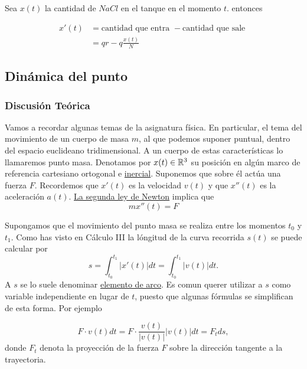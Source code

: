  Sea $x(t)$ la cantidad de $NaCl$ en el tanque en el momento $t$. entonces

\[\begin{split}
   x'(t)&=\text{cantidad que entra }-\text{cantidad que sale }\\
          &=qr-q\frac{x(t)}{N}
  \end{split}
\]




\subsection{Dinámica del punto}

\subsubsection{Discusión Teórica}
Vamos a recordar algunas temas de la asignatura física. En particular, el tema del movimiento de un cuerpo de masa $m$, al que podemos suponer puntual, dentro del espacio euclideano tridimensional. A un cuerpo de estas características lo llamaremos punto masa. Denotamos por $x(t)\in \rr^3$ su posición en algún marco de referencia cartesiano ortogonal e \href{https://es.wikipedia.org/wiki/Sistema_de_referencia_inercial}{inercial}. Suponemos
que sobre él actúa una fuerza $F$. Recordemos que $x'(t)$ es la velocidad $v(t)$ y que $x''(t)$ es la aceleración $a(t)$.
\href{http://es.wikipedia.org/wiki/Leyes_de_Newton\#Segunda_ley_de_Newton_o_ley_de_fuerza}{La segunda ley de Newton} implica que
\begin{equation}\label{2leyR}\boxed{mx''(t)=F}\end{equation}


Supongamos que el movimiento del punto masa se realiza entre los momentos $t_0$ y $t_1$. Como has visto en Cálculo III la lóngitud de la curva recorrida 
$s(t)$ se puede calcular por
\begin{equation}\label{2ley}s=\int_{t_0}^{t_1}|x'(t)|dt=\int_{t_0}^{t_1}|v(t)|dt.\end{equation}
A $s$ se lo suele denominar \href{http://es.wikipedia.org/wiki/Longitud_de_arco}{elemento de arco}. Es comun querer utilizar a $s$ como variable independiente en
lugar de $t$, puesto que algunas fórmulas se simplifican de esta forma. Por ejemplo

\begin{equation}\label{pre_trab} F\cdot v(t)dt=F\cdot\frac{v(t)}{|v(t)|}|v(t)|dt=F_tds,\end{equation}
donde $F_t$ denota la proyección de la fuerza $F$ sobre la dirección tangente a la trayectoria.





